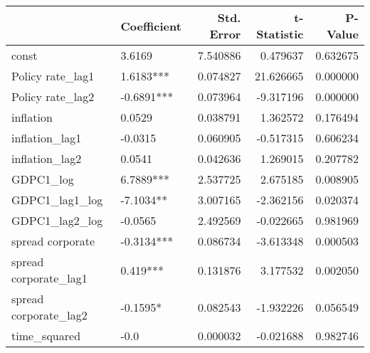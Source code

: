 \begin{tabular}{llrrr}
\toprule
 & Coefficient & Std. Error & t-Statistic & P-Value \\
\midrule
const & 3.6169 & 7.540886 & 0.479637 & 0.632675 \\
Policy rate_lag1 & 1.6183*** & 0.074827 & 21.626665 & 0.000000 \\
Policy rate_lag2 & -0.6891*** & 0.073964 & -9.317196 & 0.000000 \\
inflation & 0.0529 & 0.038791 & 1.362572 & 0.176494 \\
inflation_lag1 & -0.0315 & 0.060905 & -0.517315 & 0.606234 \\
inflation_lag2 & 0.0541 & 0.042636 & 1.269015 & 0.207782 \\
GDPC1_log & 6.7889*** & 2.537725 & 2.675185 & 0.008905 \\
GDPC1_lag1_log & -7.1034** & 3.007165 & -2.362156 & 0.020374 \\
GDPC1_lag2_log & -0.0565 & 2.492569 & -0.022665 & 0.981969 \\
spread corporate & -0.3134*** & 0.086734 & -3.613348 & 0.000503 \\
spread corporate_lag1 & 0.419*** & 0.131876 & 3.177532 & 0.002050 \\
spread corporate_lag2 & -0.1595* & 0.082543 & -1.932226 & 0.056549 \\
time_squared & -0.0 & 0.000032 & -0.021688 & 0.982746 \\
\bottomrule
\end{tabular}
